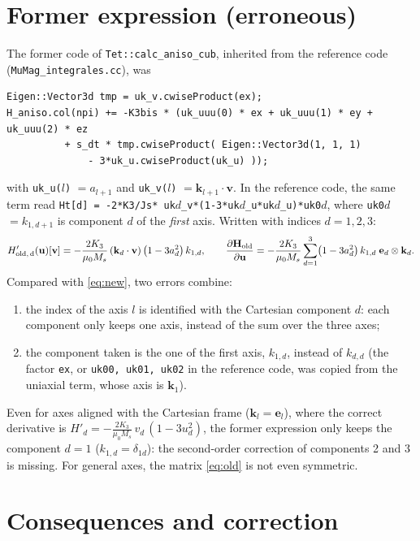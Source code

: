 \documentclass[11pt,a4paper]{article}
\newcommand{\bu}{\mathbf{u}}
\newcommand{\bv}{\mathbf{v}}
\newcommand{\bk}{\mathbf{k}}
\newcommand{\be}{\mathbf{e}}
\newcommand{\bH}{\mathbf{H}}
\begin{document}
\section{Former expression (erroneous)}

The former code of \texttt{Tet::calc\_aniso\_cub}, inherited from the reference code
(\texttt{MuMag\_integrales.cc}), was
\begin{lstlisting}
Eigen::Vector3d tmp = uk_v.cwiseProduct(ex);
H_aniso.col(npi) += -K3bis * (uk_uuu(0) * ex + uk_uuu(1) * ey + uk_uuu(2) * ez
          + s_dt * tmp.cwiseProduct( Eigen::Vector3d(1, 1, 1)
              - 3*uk_u.cwiseProduct(uk_u) ));
\end{lstlisting}
with \texttt{uk\_u($l$)} $=a_{l+1}$ and \texttt{uk\_v($l$)} $=\bk_{l+1}\cdot\bv$.
In the reference code, the same term read
\texttt{Ht[d] = -2*K3/Js* uk$d$\_v*(1-3*uk$d$\_u*uk$d$\_u)*uk0$d$}, where
\texttt{uk0$d$} $=k_{1,d+1}$ is component $d$ of the \emph{first} axis. Written with
indices $d=1,2,3$:
\begin{equation}
H'_{\rm old,\,d}(\bu)[\bv] = -\frac{2K_3}{\mu_0 M_s}\,(\bk_d\cdot\bv)\,\bigl(1-3a_d^2\bigr)\,k_{1,d},
\qquad
\frac{\partial\bH_{\rm old}}{\partial\bu}
 = -\frac{2K_3}{\mu_0 M_s}\sum_{d=1}^{3}\bigl(1-3a_d^2\bigr)\,k_{1,d}\;\be_d\otimes\bk_d .
\label{eq:old}
\end{equation}
Compared with \eqref{eq:new}, two errors combine:
\begin{enumerate}
\item the index of the axis $l$ is identified with the Cartesian component $d$: each
  component only keeps one axis, instead of the sum over the three axes;
\item the component taken is the one of the first axis, $k_{1,d}$, instead of $k_{d,d}$
  (the factor \texttt{ex}, or \texttt{uk00, uk01, uk02} in the reference code, was copied
  from the uniaxial term, whose axis is $\bk_1$).
\end{enumerate}
Even for axes aligned with the Cartesian frame ($\bk_l=\be_l$), where the correct
derivative is $H'_d=-\frac{2K_3}{\mu_0 M_s}\,v_d\,(1-3u_d^2)$, the former expression only
keeps the component $d=1$ ($k_{1,d}=\delta_{1d}$): the second-order correction of
components 2 and 3 is missing. For general axes, the matrix \eqref{eq:old} is not even
symmetric.

\section{Consequences and correction}
\end{document}
